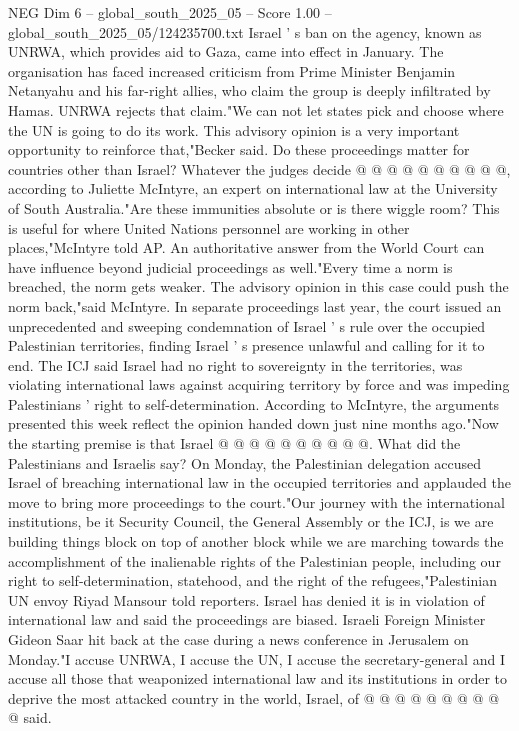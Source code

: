 \begin{textsample}{NEG Dim 6 – global\_south\_2025\_05 – Score 1.00 – global\_south\_2025\_05/124235700.txt}
Israel ' s ban on the agency, known as UNRWA, which provides aid to Gaza, came into effect in January.
The organisation has faced increased criticism from Prime Minister Benjamin Netanyahu and his far-right allies, who claim the group is deeply infiltrated by Hamas.
UNRWA rejects that claim."We can not let states pick and choose where the UN is going to do its work.
This advisory opinion is a very important opportunity to reinforce that,"Becker said.
Do these proceedings matter for countries other than Israel?
Whatever the judges decide @ @ @ @ @ @ @ @ @ @, according to Juliette McIntyre, an expert on international law at the University of South Australia."Are these immunities absolute or is there wiggle room?
This is useful for where United Nations personnel are working in other places,"McIntyre told AP.
An authoritative answer from the World Court can have influence beyond judicial proceedings as well."Every time a norm is breached, the norm gets weaker.
The advisory opinion in this case could push the norm back,"said McIntyre.
In separate proceedings last year, the court issued an unprecedented and sweeping condemnation of Israel ' s rule over the occupied Palestinian territories, finding Israel ' s presence unlawful and calling for it to end.
The ICJ said Israel had no right to sovereignty in the territories, was violating international laws against acquiring territory by force and was impeding Palestinians ' right to self-determination.
According to McIntyre, the arguments presented this week reflect the opinion handed down just nine months ago."Now the starting premise is that Israel @ @ @ @ @ @ @ @ @ @.
What did the Palestinians and Israelis say?
On Monday, the Palestinian delegation accused Israel of breaching international law in the occupied territories and applauded the move to bring more proceedings to the court."Our journey with the international institutions, be it Security Council, the General Assembly or the ICJ, is we are building things block on top of another block while we are marching towards the accomplishment of the inalienable rights of the Palestinian people, including our right to self-determination, statehood, and the right of the refugees,"Palestinian UN envoy Riyad Mansour told reporters.
Israel has denied it is in violation of international law and said the proceedings are biased.
Israeli Foreign Minister Gideon Saar hit back at the case during a news conference in Jerusalem on Monday."I accuse UNRWA, I accuse the UN, I accuse the secretary-general and I accuse all those that weaponized international law and its institutions in order to deprive the most attacked country in the world, Israel, of @ @ @ @ @ @ @ @ @ @ said.

\end{textsample}
